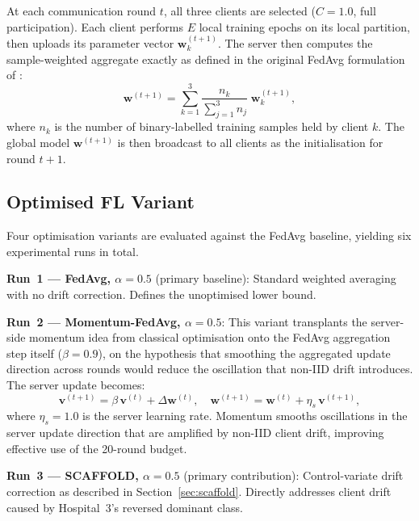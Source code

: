 At each communication round $t$, all three clients are
selected ($C = 1.0$, full participation).
Each client performs $E$ local training epochs on its
local partition, then uploads its parameter vector
$\mathbf{w}_k^{(t+1)}$.
The server then computes the sample-weighted aggregate
exactly as defined in the original FedAvg formulation
of \textcite{mcmahan2017fedavg}:
\begin{equation}
  \mathbf{w}^{(t+1)}
  = \sum_{k=1}^{3}
    \frac{n_k}{\displaystyle\sum_{j=1}^{3} n_j}\;
    \mathbf{w}_k^{(t+1)},
  \label{eq:fedavg-ch3}
\end{equation}
where $n_k$ is the number of binary-labelled training
samples held by client $k$.
The global model $\mathbf{w}^{(t+1)}$ is then broadcast
to all clients as the initialisation for round $t+1$.


\subsection{Optimised FL Variant}
\label{sec:fl-optimised}

Four optimisation variants are evaluated against the
FedAvg baseline, yielding six experimental runs in total.

\textbf{Run~1 --- FedAvg, $\alpha=0.5$} (primary baseline):
Standard weighted averaging with no drift correction.
Defines the unoptimised lower bound.

\textbf{Run~2 --- Momentum-FedAvg, $\alpha=0.5$}:
This variant transplants the server-side momentum idea
from classical optimisation \cite{kingma2015adam} onto
the FedAvg aggregation step itself ($\beta = 0.9$),
on the hypothesis that smoothing the aggregated update
direction across rounds would reduce the oscillation
that non-IID drift introduces.
The server update becomes:
\begin{equation}
  \mathbf{v}^{(t+1)} = \beta\,\mathbf{v}^{(t)}
    + \Delta\mathbf{w}^{(t)}, \quad
  \mathbf{w}^{(t+1)} = \mathbf{w}^{(t)}
    + \eta_s\,\mathbf{v}^{(t+1)},
  \label{eq:momentum-fedavg}
\end{equation}
where $\eta_s=1.0$ is the server learning rate.
Momentum smooths oscillations in the server update
direction that are amplified by non-IID client drift,
improving effective use of the 20-round budget.

\textbf{Run~3 --- SCAFFOLD, $\alpha=0.5$} (primary contribution):
Control-variate drift correction as described in
Section~\ref{sec:scaffold}.
Directly addresses client drift caused by
Hospital~3's reversed dominant class.

